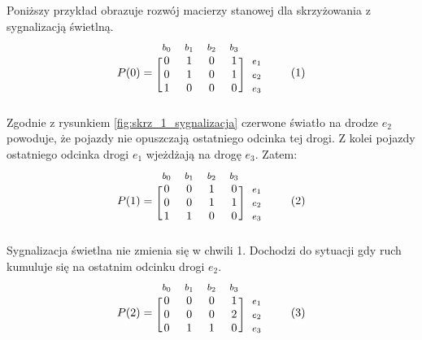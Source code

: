 \documentclass[12pt]{book}
\newcommand\addtag{\refstepcounter{equation}
\renewcommand{\labelenumii}{\theenumii}
\renewcommand{\theenumii}{\theenumi.\arabic{enumii}.}
\tag{\theequation}}
\begin{document}
Poniższy przykład obrazuje rozwój macierzy stanowej dla skrzyżowania z sygnalizacją świetlną.
\begin{equation*}
  P(0)=
  \begin{blockarray}{*{4}{c} l}
    \begin{block}{*{4}{>{$\footnotesize}c<{$}} l}
      $b_0$ & $b_1$ & $b_2$ & $b_3$ \\
    \end{block}
    \begin{block}{[*{4}{c}]>{$\footnotesize}l<{$}}
       0 & 1 & 0 & 1 & $e_1$ \\
       0 & 1 & 0 & 1 & $e_2$ \\
       1 & 0 & 0 & 0 & $e_3$ \\
    \end{block}
  \end{blockarray} \addtag \label{skrz_1_zmiennaStanu_0_sygnalizacja}
\end{equation*}
Zgodnie z rysunkiem \ref{fig:skrz_1_sygnalizacja} czerwone światło na drodze $e_2$ powoduje, że pojazdy nie opuszczają ostatniego odcinka tej drogi. Z kolei pojazdy ostatniego odcinka drogi $e_1$ wjeżdżają na drogę $e_3$. Zatem: 
\begin{equation*}
  P(1)=
  \begin{blockarray}{*{4}{c} l}
    \begin{block}{*{4}{>{$\footnotesize}c<{$}} l}
      $b_0$ & $b_1$ & $b_2$ & $b_3$ \\
    \end{block}
    \begin{block}{[*{4}{c}]>{$\footnotesize}l<{$}}
       0 & 0 & 1 & 0 & $e_1$ \\
       0 & 0 & 1 & 1 & $e_2$ \\
       1 & 1 & 0 & 0 & $e_3$ \\
    \end{block}
  \end{blockarray} \addtag \label{skrz_1_zmiennaStanu_0_sygnalizacja}
\end{equation*}
Sygnalizacja świetlna nie zmienia się w chwili 1. Dochodzi do sytuacji gdy ruch kumuluje się na ostatnim odcinku drogi $e_2$.
\begin{equation*}
  P(2)=
  \begin{blockarray}{*{4}{c} l}
    \begin{block}{*{4}{>{$\footnotesize}c<{$}} l}
      $b_0$ & $b_1$ & $b_2$ & $b_3$ \\
    \end{block}
    \begin{block}{[*{4}{c}]>{$\footnotesize}l<{$}}
       0 & 0 & 0 & 1 & $e_1$ \\
       0 & 0 & 0 & 2 & $e_2$ \\
       0 & 1 & 1 & 0 & $e_3$ \\
    \end{block}
  \end{blockarray} \addtag \label{skrz_1_zmiennaStanu_0_sygnalizacja}
\end{equation*}
\end{document}
